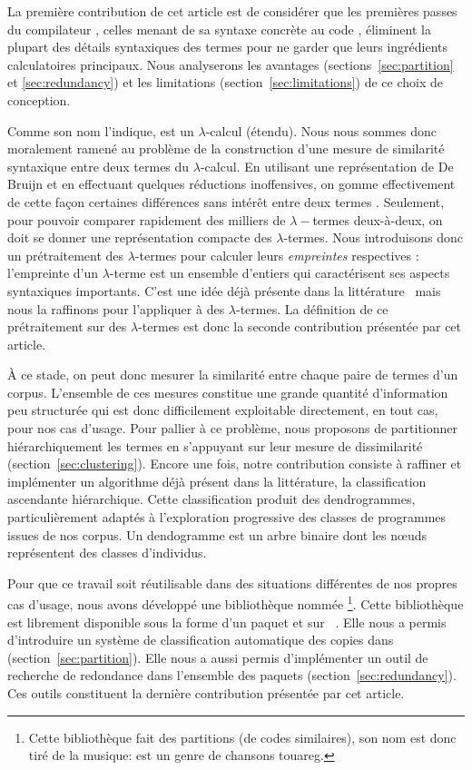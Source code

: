 La première contribution de cet article est de considérer que les
premières passes du compilateur {\OCaml}, celles menant de sa syntaxe
concrète au code {\LambdaCode}, éliminent la plupart des détails
syntaxiques des termes {\OCaml} pour ne garder que leurs ingrédients
calculatoires principaux. Nous analyserons les avantages
(sections~\ref{sec:partition} et \ref{sec:redundancy}) et les
limitations (section~\ref{sec:limitations}) de ce choix de conception.

Comme son nom l'indique, {\LambdaCode} est un $\lambda$-calcul
(étendu). Nous nous sommes donc moralement ramené au problème de la
construction d'une mesure de similarité syntaxique entre deux termes
du $\lambda$-calcul. En utilisant une représentation de De Bruijn et
en effectuant quelques réductions inoffensives, on gomme effectivement
de cette façon certaines différences sans intérêt entre deux termes
{\OCaml}. Seulement, pour pouvoir comparer rapidement des milliers de
$\lambda-$termes deux-à-deux, on doit se donner une représentation
compacte des $\lambda$-termes. Nous introduisons donc un prétraitement
des $\lambda$-termes pour calculer leurs \textit{empreintes}
respectives : l'empreinte d'un $\lambda$-terme est un ensemble
d'entiers qui caractérisent ses aspects syntaxiques importants. C'est
une idée déjà présente dans la
littérature~\cite{chilowicz:hal-00627811} mais nous la raffinons pour
l'appliquer à des $\lambda$-termes.  La définition de ce prétraitement
sur des $\lambda$-termes est donc la seconde contribution présentée
par cet article.

À ce stade, on peut donc mesurer la similarité entre chaque paire de
termes d'un corpus. L'ensemble de ces mesures constitue une grande
quantité d'information peu structurée qui est donc difficilement
exploitable directement, en tout cas, pour nos cas d'usage. Pour
pallier à ce problème, nous proposons de partitionner hiérarchiquement
les termes en s'appuyant sur leur mesure de dissimilarité
(section~\ref{sec:clustering}). Encore une fois, notre contribution
consiste à raffiner et implémenter un algorithme déjà présent dans la
littérature, la classification ascendante hiérarchique. Cette
classification produit des dendrogrammes, particulièrement adaptés à
l'exploration progressive des classes de programmes issues de nos
corpus. Un dendogramme est un arbre binaire dont les n{\oe}uds
représentent des classes d'individus.

Pour que ce travail soit réutilisable dans des situations différentes
de nos propres cas d'usage, nous avons développé une bibliothèque
nommée {\Asak}\footnote{Cette bibliothèque fait des partitions (de
codes similaires), son nom est donc tiré de la musique: {\Asak} est un
genre de chansons touareg.}.  Cette bibliothèque est librement
disponible sous la forme d'un paquet {\Opam} et sur
{\GitHub}~\cite{asak}.  Elle nous a permis d'introduire un système de
classification automatique des copies dans
{\LearnOCaml}~\cite{learnocaml} (section~\ref{sec:partition}). Elle
nous a aussi permis d'implémenter un outil de recherche de redondance
dans l'ensemble des paquets {\Opam}
(section~\ref{sec:redundancy}). Ces outils constituent la dernière
contribution présentée par cet article.

